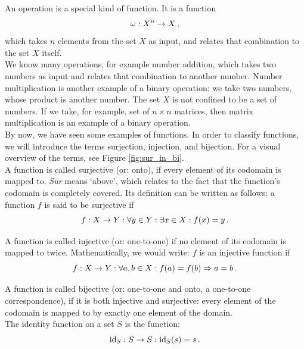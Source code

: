         An operation is a special kind of function. It is a function
        \begin{equation}
            \omega: X^n \rightarrow X \thinspace ,
        \end{equation}
        which takes $n$ elements from the set $X$ as input, and relates that combination to the set $X$ itself. \\

        We know many operations, for example number addition, which takes two numbers as input and relates that combination to another number. Number multiplication is another example of a binary operation: we take two numbers, whose product is another number. The set $X$ is not confined to be a set of numbers. If we take, for example, set of $n \times n$ matrices, then matrix multiplication is an example of a binary operation. \\

        By now, we have seen some examples of functions. In order to classify functions, we will introduce the terms surjection, injection, and bijection. For a visual overview of the terms, see Figure \ref{fig:sur_in_bi}. \\

        A function is called surjective (or: onto), if every element of its codomain is mapped to. \emph{Sur} means `above', which relates to the fact that the function's codomain is completely covered. Its definition can be written as follows: a function $f$ is said to be surjective if
        \begin{equation}
            f: X \rightarrow Y: \forall y \in Y: \exists x \in X: f(x) = y \thinspace .
        \end{equation}

        A function is called injective (or: one-to-one) if no element of its codomain is mapped to twice. Mathematically, we would write: $f$ is an injective function if
        \begin{equation}
            f: X \rightarrow Y: \forall a, b \in X: f(a) = f(b) \Rightarrow a = b \thinspace .
        \end{equation}

        A function is called bijective (or: one-to-one and onto, a one-to-one correspondence), if it is both injective and surjective: every element of the codomain is mapped to by exactly one element of the domain. \\

        The identity function on a set $S$ is the function:
        \begin{equation}
            \operatorname{id}_S: S \rightarrow S: \operatorname{id}_S(s) = s \thinspace .
        \end{equation}

